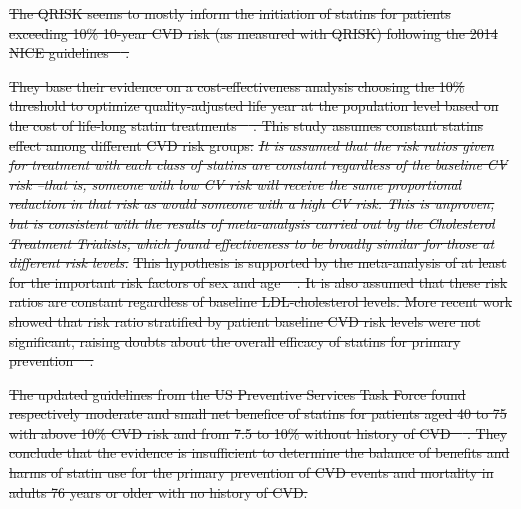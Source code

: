 \documentclass[10pt,letterpaper]{article}
\providecommand{\DIFdeltex}[1]{{\protect\color{red}\sout{#1}}}                      %
\providecommand{\DIFdelbegin}{} %
\providecommand{\DIFdelend}{} %
\providecommand{\DIFdel}[1]{\texorpdfstring{\DIFdeltex{#1}}{}} %
\newcommand{\DIFscaledelfig}{0.5}
\newlength{\DIFdelgraphicswidth} %
\newlength{\DIFdelgraphicsheight} %
\newcommand{\DIFdelincludegraphics}[2][]{%
\sbox{\DIFdelgraphicsbox}{\DIFOincludegraphics[#1]{#2}}%
\settoboxwidth{\DIFdelgraphicswidth}{\DIFdelgraphicsbox} %
\settoboxtotalheight{\DIFdelgraphicsheight}{\DIFdelgraphicsbox} %
\scalebox{\DIFscaledelfig}{%
\parbox[b]{\DIFdelgraphicswidth}{\usebox{\DIFdelgraphicsbox}\\[-\baselineskip] \rule{\DIFdelgraphicswidth}{0em}}\llap{\resizebox{\DIFdelgraphicswidth}{\DIFdelgraphicsheight}{%
\setlength{\unitlength}{\DIFdelgraphicswidth}%
\begin{picture}(1,1)%
\thicklines\linethickness{2pt} %
{\color[rgb]{1,0,0}\put(0,0){\framebox(1,1){}}}%
{\color[rgb]{1,0,0}\put(0,0){\line( 1,1){1}}}%
{\color[rgb]{1,0,0}\put(0,1){\line(1,-1){1}}}%
\end{picture}%
}\hspace*{3pt}}} %
} %
\DeclareRobustCommand{\DIFdelbegin}{\DIFOdelbegin \let\includegraphics\DIFdelincludegraphics} %
\DeclareRobustCommand{\DIFdelend}{\DIFOaddend \let\includegraphics\DIFOincludegraphics} %
\begin{document}
\DIFdelbegin \DIFdel{The QRISK seems to mostly inform the initiation of statins for patients
  exceeding 10\% 10-year CVD risk (as measured with QRISK) following the 2014
  NICE guidelines \mbox{%
    \cite{rabar2014lipid}}\hskip0pt%
  .
}\DIFdelend %

\DIFdelbegin \DIFdel{They base their evidence on a cost-effectiveness analysis choosing the 10\%
  threshold to optimize quality-adjusted life year at the population level based
  on the cost of life-long statin treatments \mbox{%
    \cite{guthrie2023competing}}\hskip0pt%
  . This
  study assumes constant statins effect among different CVD risk groups:
}\emph{\DIFdel{It is assumed that the risk ratios given for treatment with each class
    of statins are constant regardless of the baseline CV risk --that is, someone
    with low CV risk will receive the same proportional reduction in that risk as
    would someone with a high CV risk. This is unproven, but is consistent with
    the results of meta-analysis carried out by the Cholesterol Treatment
    Trialists, which found effectiveness to be broadly similar for those at
    different risk levels.}} %
\DIFdel{This hypothesis is supported by the meta-analysis of
  at least for the important risk factors of sex and age \mbox{%
    \cite{brugts2009benefits}}\hskip0pt%
  . It is also assumed that these risk ratios are constant regardless of
  baseline LDL-cholesterol levels. More recent work showed that risk ratio
  stratified by patient baseline CVD risk levels were not significant, raising
  doubts about the overall efficacy of statins for primary prevention \mbox{%
    \cite{byrne2019statins}}\hskip0pt%
  .
}\DIFdelend %

\DIFdelbegin \DIFdel{The updated guidelines from the US Preventive Services Task Force found
  respectively moderate and small net benefice of statins for patients aged 40
  to 75 with above 10\% CVD risk and from 7.5 to 10\% without history of CVD
  \mbox{%
    \cite{chou2022statin}}\hskip0pt%
  . They conclude that the evidence is insufficient to
  determine the balance of benefits and harms of statin use for the primary
  prevention of CVD events and mortality in adults 76 years or older with no
  history of CVD.
}\DIFdelend %
\end{document}
